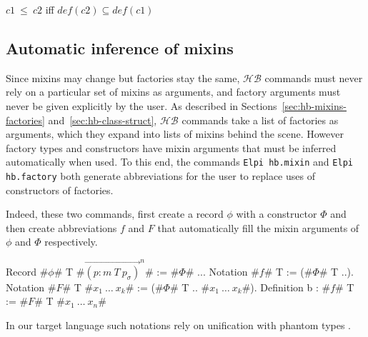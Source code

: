 \documentclass[a4paper,UKenglish,cleveref, autoref]{lipics-v2019}
\newcommand{\HB}{\ensuremath{\mathcal{HB}}}
\newcommand{\mixin}{mixin}
\newcommand{\mixins}{mixins}
\newcommand{\factory}{factory}
\newcommand{\factories}{factories}
\newcommand{\phantterms}{abbreviations}
\newcommand{\C}{\ensuremath{\mathcal{C}}}
\newcommand{\class}{class}
\newcommand{\cdef}{\ensuremath{\mathit{def}}}
\newcommand{\issubclass}{\ensuremath{\leq}}
\newcommand{\subclass}{subclass}
\newcommand{\join}{\ensuremath{\mathit{join}}}
\newcommand{\vect}[1]{\overrightarrow{#1}}
\newcommand{\pmp}[1]{\ensuremath{\vect{\left(p : m\ T\ p_\sigma\right)}^{#1}}}
\newcommand{\hbmixin}{{\tt\color{dkgreen}Elpi hb.mixin}}
\newcommand{\hbfactory}{{\tt\color{dkgreen}Elpi hb.factory}}
\theoremstyle{implem}
\theoremstyle{implem}
\theoremstyle{command}
\begin{document}
\begin{definition}[\issubclass{} \(\in \C{}\times\C{}\), \subclass{}]\label{def:subclass}
  \(c1~\issubclass{}~c2\) iff \(\cdef{}(c2) \subseteq \cdef{}(c1)\)
  \end{definition}

\subsection{Automatic inference of \mixins{}}
\label{sec:autom-infer-mixins}

Since \mixins{} may change but \factories{} stay the same, \HB{}
commands must never rely on a particular set of \mixins{} as
arguments, and \factory{} arguments must never be given explicitly by
the user. As described in Sections~\ref{sec:hb-mixins-factories}
and~\ref{sec:hb-class-struct}, \HB{} commands take a list of
\factories{} as arguments, which they expand into lists of \mixins{}
behind the scene. However \factory{} types and constructors have
\mixin{} arguments that must be inferred automatically when used. To
this end, the commands \hbmixin{} and \hbfactory{} both generate
\phantterms{} for the user to replace uses of constructors of \factories{}.

Indeed, these two commands, first create a record \(\phi\) with a
constructor \(\Phi\) and then create abbreviations \(f\) and \(F\)
that automatically fill the mixin arguments of \(\phi\) and \(\Phi\)
respectively.

\begin{coqcode}
Record #\(\phi\)# T #\(\pmp{n}\)# := #\(\Phi\)# {..}.
Notation #$f$# T := (#\(\Phi\)# T ..).
Notation #$F$# T  #\(x_1\ \ldots\ x_k\)# := (#\(\Phi\)# T .. #\(x_1\ \ldots\ x_k\)#).
Definition b : #$f$# T := #$F$# T #\(x_1\ \ldots\ x_n\)#
\end{coqcode}

In our target language such notations rely on unification with
phantom types \cite{DBLP:conf/itp/MahboubiT13}.





\end{document}

